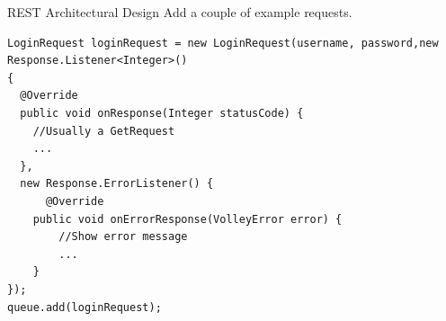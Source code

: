 \begin{frame}[fragile]{REST Architectural Design}
Add a couple of example requests.

\begin{minipage}[H]{0.9\linewidth}
\begin{lstlisting}
LoginRequest loginRequest = new LoginRequest(username, password,new Response.Listener<Integer>() 
{
  @Override
  public void onResponse(Integer statusCode) {
    //Usually a GetRequest
    ...
  }, 
  new Response.ErrorListener() {
	  @Override
    public void onErrorResponse(VolleyError error) {
    	//Show error message
    	...
    }
});
queue.add(loginRequest);

\end{lstlisting}
\end{minipage}
\end{frame}

